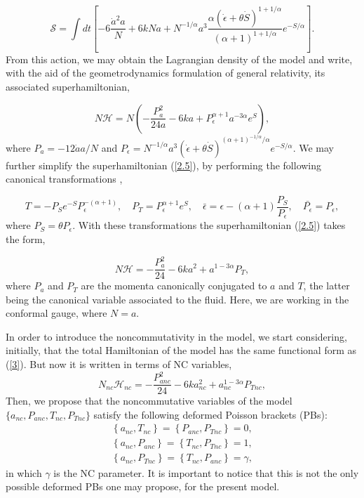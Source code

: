 \documentclass[12pt]{article}
\newcommand{\be}{\begin{equation}}
\newcommand{\ee}{\end{equation}}
\newcommand{\ea}{\end{eqnarray}}
\newcommand{\ba}{\begin{eqnarray}}
\newcommand{\0}{{(0)}}
\newcommand{\1}{{(1)}}
\newcommand{\2}{{(2)}}
\newcommand{\ep}{{\epsilon}}
\begin{document}
\be
\label{2.4}
\mathcal{S}=\int dt\left[-6\frac{\dot{a}^2a}{N} + 6kNa + 
N^{-1/\alpha}a^3\frac{\alpha(\dot{\ep}+\theta\dot{S})^{1+1/\alpha}}{(\alpha+1)^{1+1/\alpha}}e^{-S/\alpha}\right].
\ee
From this action, we may obtain the Lagrangian density of the model and write, with the aid of the geometrodynamics formulation
of general relativity, its associated superhamiltonian,

\be
\label{2.5}
N{\mathcal{H}}=N\left(-\frac{P_{a}^2}{24a} - 6ka + P_{\ep}^{\alpha+1}a^{-3\alpha}e^S\right),
\ee
where $P_a = -12\dot{a}a/N$ and $P_\ep = N^{-1/\alpha}a^3(\dot{\ep}+\theta\dot{S})^{(\alpha+1)^{-1/\alpha}/\alpha}e^{-S/\alpha}$.
We may further simplify the superhamiltonian (\ref{2.5}), by performing the following canonical transformations \cite{germano1},

\be
\label{2.6}
T = -P_S e^{-S}P_\ep^{-(\alpha+1)},\quad P_T = P_\ep^{\alpha+1}e^S,\quad \bar{\ep} = \ep-(\alpha+1)\frac{P_S}{P_\ep},\quad \bar{P_\ep} = P_\ep,
\ee
where $P_S = \theta P_\ep$. With these transformations the superhamiltonian (\ref{2.5}) takes the form,

\begin{equation}
N {\mathcal{H}}= -\frac{P_{a}^2}{24} - 6ka^2 + a^{1-3\alpha}P_{T},  
\label{3}
\end{equation}
where $P_{a}$ and $P_{T}$ are the momenta canonically conjugated to $a$ and 
$T$, the latter being the canonical variable associated to the fluid.
Here, we are working in the conformal gauge, where $N = a$.

In order to introduce the noncommutativity in the model, we start considering,
initially, that the total Hamiltonian of the model has the same functional form 
as (\ref{3}). But now it is written in terms of NC variables,
\begin{equation}
N_{nc} {\mathcal{H}}_{nc}= -\frac{P_{anc}^2}{24} - 6ka_{nc}^2 + a_{nc}^{1-3\alpha}P_{Tnc},  
\label{3,5}
\end{equation}
Then, we propose that the noncommutative variables of the model \\
$\{a_{nc}, P_{anc}, T_{nc}, P_{Tnc}\}$ satisfy the following deformed Poisson brackets (PBs):
\ba
\label{4}
\left\{a_{nc},T_{nc}\right\}=\left\{P_{anc},P_{Tnc}\right\}=0,\\
\label{4.1}
\left\{a_{nc},P_{anc}\right\}=\left\{T_{nc},P_{Tnc}\right\}=1,\\
\label{4.2}
\left\{a_{nc},P_{Tnc}\right\}=\left\{T_{nc},P_{anc}\right\}=\gamma,
\ea 
in which $\gamma$ is the NC parameter. It is important to notice that this is
not the only possible deformed PBs one may propose, for the present model. 
\end{document}
